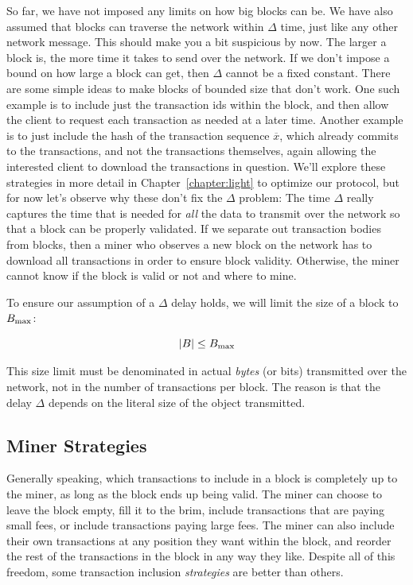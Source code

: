 So far, we have not imposed any limits on how big blocks can be. We have also assumed
that blocks can traverse the network within $\Delta$ time, just like any other network message.
This should make you a bit suspicious by now. The larger a block is, the more time it
takes to send over the network. If we don't impose a bound on how large a block can get,
then $\Delta$ cannot be a fixed constant. There are some simple ideas to make blocks of
bounded size that don't work. One such example is to include just the transaction ids
within the block, and then allow the client to request each transaction as needed at
a later time. Another example is to just include the hash of the transaction sequence
$\overline{x}$, which already commits to the transactions, and not the transactions
themselves, again allowing the interested client to download the transactions in question.
We'll explore these strategies in more detail in Chapter~\ref{chapter:light} to optimize
our protocol, but for now let's observe why these don't fix the $\Delta$ problem:
The time $\Delta$ really captures the time that is needed for \emph{all} the data
to transmit over the network so that a block can be properly validated. If we separate
out transaction bodies from blocks, then a miner who observes a new block on the network
has to download all transactions in order to ensure block validity. Otherwise, the
miner cannot know if the block is valid or not and where to mine.

To ensure our assumption of a $\Delta$ delay holds, we will limit the size of a block
to $B_\mathrm{max}$:

\[
    |B| \leq B_\mathrm{max}
\]

This size limit must be denominated in actual \emph{bytes} (or bits) transmitted
over the network, not in the number of transactions per block. The reason is that the delay
$\Delta$ depends on the literal size of the object transmitted.


\subsection*{Miner Strategies}

Generally speaking, which transactions to include in a block is completely up to the miner,
as long as the block ends up being valid. The miner can choose to leave the block empty,
fill it to the brim, include transactions that are paying small fees, or include transactions
paying large fees. The miner can also include their own transactions at any position they
want within the block, and reorder the rest of the transactions in the block in any way
they like. Despite all of this freedom, some transaction inclusion \emph{strategies} are better than
others.

